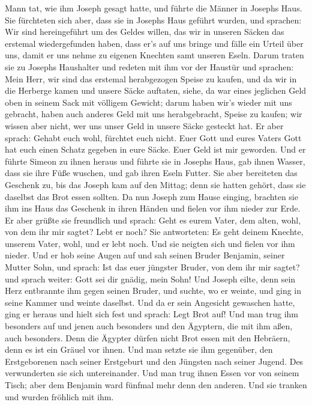 Mann tat, wie ihm Joseph gesagt hatte, und führte die Männer in Josephs
Haus.  Sie fürchteten sich aber, dass sie in Josephs Haus
geführt wurden, und sprachen: Wir sind hereingeführt um des Geldes
willen, das wir in unseren Säcken das erstemal wiedergefunden haben,
dass er's auf uns bringe und fälle ein Urteil über uns, damit er uns
nehme zu eigenen Knechten samt unseren Eseln.  Darum
traten sie zu Josephs Haushalter und redeten mit ihm vor der Haustür
 und sprachen: Mein Herr, wir sind das erstemal
herabgezogen Speise zu kaufen,  und da wir in die
Herberge kamen und unsere Säcke auftaten, siehe, da war eines jeglichen
Geld oben in seinem Sack mit völligem Gewicht; darum haben wir's wieder
mit uns gebracht,  haben auch anderes Geld mit uns
herabgebracht, Speise zu kaufen; wir wissen aber nicht, wer uns unser
Geld in unsere Säcke gesteckt hat.  Er aber sprach:
Gehabt euch wohl, fürchtet euch nicht. Euer Gott und eures Vaters Gott
hat euch einen Schatz gegeben in eure Säcke. Euer Geld ist mir geworden.
Und er führte Simeon zu ihnen heraus  und führte sie in
Josephs Haus, gab ihnen Wasser, dass sie ihre Füße wuschen, und gab
ihren Eseln Futter.  Sie aber bereiteten das Geschenk zu,
bis das Joseph kam auf den Mittag; denn sie hatten gehört, dass sie
daselbst das Brot essen sollten.  Da nun Joseph zum Hause
einging, brachten sie ihm ins Haus das Geschenk in ihren Händen und
fielen vor ihm nieder zur Erde.  Er aber grüßte sie
freundlich und sprach: Geht es eurem Vater, dem alten, wohl, von dem ihr
mir sagtet? Lebt er noch?  Sie antworteten: Es geht
deinem Knechte, unserem Vater, wohl, und er lebt noch. Und sie neigten
sich und fielen vor ihm nieder.  Und er hob seine Augen
auf und sah seinen Bruder Benjamin, seiner Mutter Sohn, und sprach: Ist
das euer jüngster Bruder, von dem ihr mir sagtet? und sprach weiter:
Gott sei dir gnädig, mein Sohn!  Und Joseph eilte, denn
sein Herz entbrannte ihm gegen seinen Bruder, und suchte, wo er weinte,
und ging in seine Kammer und weinte daselbst.  Und da er
sein Angesicht gewaschen hatte, ging er heraus und hielt sich fest und
sprach: Legt Brot auf!  Und man trug ihm besonders auf
und jenen auch besonders und den Ägyptern, die mit ihm aßen, auch
besonders. Denn die Ägypter dürfen nicht Brot essen mit den Hebräern,
denn es ist ein Gräuel vor ihnen.  Und man setzte sie ihm
gegenüber, den Erstgeborenen nach seiner Erstgeburt und den Jüngsten
nach seiner Jugend. Des verwunderten sie sich untereinander.
 Und man trug ihnen Essen vor von seinem Tisch; aber dem
Benjamin ward fünfmal mehr denn den anderen. Und sie tranken und wurden
fröhlich mit ihm.

